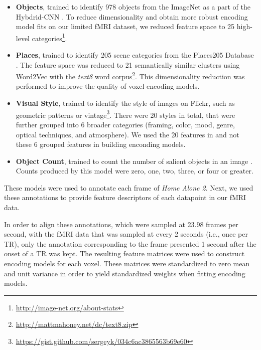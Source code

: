 \documentclass[10pt,twocolumn,letterpaper]{article}
\begin{document}
\begin{itemize}

\item \textbf{Objects}, trained to identify 978 objects from the ImageNet as a part of the Hybdrid-CNN \cite{zhou2014learning}. To reduce dimensionality and obtain more robust encoding model fits on our limited fMRI dataset, we reduced feature space to 25 high-level categories\footnote{\url{http://image-net.org/about-stats}}.

\item \textbf{Places}, trained to identify 205 scene categories from the Places205 Database \cite{zhou2014learning}. The feature space was reduced to 21 semantically similar clusters using Word2Vec \cite{mikolov2013efficient} with the \textit{text8} word corpus\footnote{\url{http://mattmahoney.net/dc/text8.zip}}. This dimensionality reduction was performed to improve the quality of voxel encoding models.

\item \textbf{Visual Style}, trained to identify the style of images on Flickr, such as geometric patterns or vintage\footnote{\url{https://gist.github.com/sergeyk/034c6ac3865563b69e60}}. There were 20 styles in total, that were further grouped into 6 broader categories (framing, color, mood, genre, optical techniques, and atmosphere). We used the 20 features in and not these 6 grouped features in building enconding models.

\item \textbf{Object Count}, trained to count the number of salient objects in an image \cite{zhang2015salient}. Counts produced by this model were zero, one, two, three, or four or greater.

\end{itemize}

These models were used to annotate each frame of \textit{Home Alone 2}. Next, we used these annotations to provide feature descriptors of each datapoint in our fMRI data.

In order to align these annotations, which were sampled at 23.98 frames per second, with the fMRI data that was sampled at every 2 seconds (i.e., once per TR), only the annotation corresponding to the frame presented 1 second after the onset of a TR was kept. The resulting feature matrices were used to construct encoding models for each voxel. These matrices were standardized to zero mean and unit variance in order to yield standardized weights when fitting encoding models.
\end{document}
